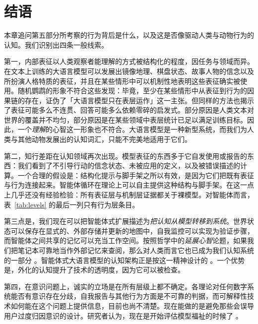 \section{结语}
本章追问第五部分所考察的行为背后是什么，以及这是否像驱动人类与动物行为的认知。我们识别出四条一般线索。

第一，内部表征以人类观察者能理解的方式被结构化的程度，因任务与领域而异。在文本上训练的大语言模型可以发展出镜像地理、棋盘状态、故事人物的信念以及所扮演人格特质的表征，并且在某些情形中可以机制性地表明这些表征确实被使用。随机鹦鹉的形象不符合这些发现：毕竟，至少在某些情形中从表征到行为的因果链的存在，证伪了「大语言模型只在表层运作」这一主张。但同样的方法也揭示了表征可能多么不连贯、回答可能多么依赖零碎的启发式。部分原因是人类文本对世界的覆盖并不均匀，部分原因是在某些领域中表层统计已足以满足训练目标。因此，一个\emph{理解}的心智这一形象也不符合。大语言模型是一种新型系统，而我们为人类与其他动物发展出的认知词汇，只能不完美地适用于它们。

第二，知行差距在认知领域再次出现。模型表征的东西多于它自发使用或报告的东西：我们看到了不引导行动的信念状态、未被应用的定义，以及被错误描述的计算。一个合理的假设是：结构化提示与脚手架之所以有效，是因为它们把既有表征与行为连接起来。智能体循环在理论上可以自主提供这种结构与脚手架。在这一点上几乎还没有经验检验：所有表征层与机制层证据都关于裸模型。对智能体而言，表~\ref{tab:levels} 的最后一列只有行为层条目。


第三点是，我们现在可以把智能体式扩展描述为\emph{把认知从模型转移到系统}。世界状态可以保存在显式的、外部存储并更新的地图中，自我监控可以实现为验证步骤，而智能体之间共享的记忆可以充当工作空间。按照哲学中的\emph{延展心智}论题，如果我们把笔记本可靠地当作外部记忆来查阅，那么对人类而言它也已成为我们认知系统的一部分 \citep{clark1998extended}。智能体式大语言模型的认知架构正是按这一精神设计的 \citep{sumers2024cognarch}。一个优势是，外化的认知提升了技术的透明度，因为它可以被检查。

第四，在意识问题上，诚实的立场是在所有层级上都不确定。各理论对任何数字系统能否有意识存在分歧，自我报告与其他行为方面是不可靠的判据，而可解释性技术如何能在这个问题上提供信息，目前也尚不清楚。现在能做的是避免那些会误导用户过度归因意识的设计。研究者认为，现在是开始评估模型福祉的时候了 \citep{butlin2023consciousness,long2024taking}。




